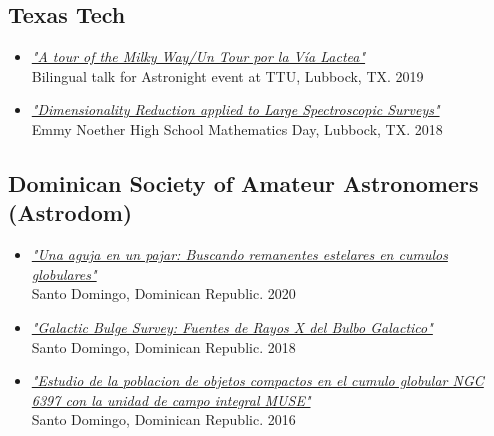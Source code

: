 \documentclass[letterpaper,10pt]{article}
\begin{document}
\subsection*{Texas Tech}

\begin{itemize}[label=$\blacktriangleright$]

	\item \textit{\href{https://slides.com/mmarcano22/a-tour-of-the-milky-way-2\#/}{"A tour of the Milky Way/Un Tour por la V\'ia Lactea"}} \\ Bilingual talk for Astronight event at TTU, Lubbock, TX. 2019


	\item \textit{\href{http://manuelpm.me/PCASDSS/}{"Dimensionality Reduction applied to Large Spectroscopic Surveys"}} \\ Emmy Noether High School Mathematics Day, Lubbock, TX. 2018




\end{itemize}


\subsection*{Dominican Society of Amateur Astronomers (Astrodom)}

\begin{itemize}[label=$\blacktriangleright$]


    \item \textit{\href{https://manuelpm.me/AstrodomJulio2020/}{"Una aguja en un pajar: Buscando remanentes estelares en cumulos globulares"}} \\ Santo Domingo, Dominican Republic. 2020


	\item \textit{\href{http://manuelpm.me/AstrodomGBStalk/}{"Galactic Bulge Survey: Fuentes de Rayos X del Bulbo Galactico"}} \\ Santo Domingo, Dominican Republic. 2018



	\item \textit{\href{http://manuelpm.me/Astrodomtalk/}{"Estudio de la poblacion de objetos compactos en el cumulo globular NGC 6397 con la unidad de campo integral MUSE"}} \\Santo Domingo, Dominican Republic. 2016

\end{itemize}
\end{document}
